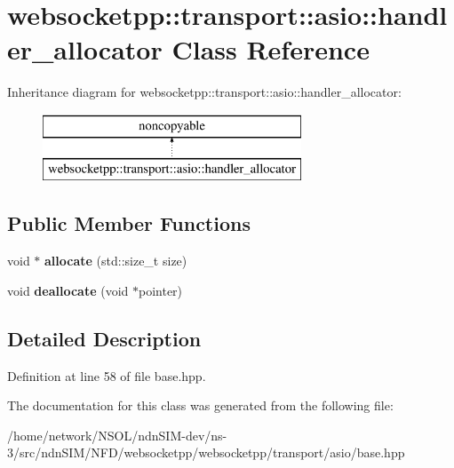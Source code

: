 \hypertarget{classwebsocketpp_1_1transport_1_1asio_1_1handler__allocator}{}\section{websocketpp\+:\+:transport\+:\+:asio\+:\+:handler\+\_\+allocator Class Reference}
\label{classwebsocketpp_1_1transport_1_1asio_1_1handler__allocator}
Inheritance diagram for websocketpp\+:\+:transport\+:\+:asio\+:\+:handler\+\_\+allocator\+:\begin{figure}[H]
\begin{center}
\leavevmode
\includegraphics[height=2.000000cm]{classwebsocketpp_1_1transport_1_1asio_1_1handler__allocator}
\end{center}
\end{figure}
\subsection*{Public Member Functions}
\begin{DoxyCompactItemize}
\item 
void $\ast$ {\bfseries allocate} (std\+::size\+\_\+t size)\hypertarget{classwebsocketpp_1_1transport_1_1asio_1_1handler__allocator_a8c004c7c383e8de53d02652cac71f5bb}{}\label{classwebsocketpp_1_1transport_1_1asio_1_1handler__allocator_a8c004c7c383e8de53d02652cac71f5bb}

\item 
void {\bfseries deallocate} (void $\ast$pointer)\hypertarget{classwebsocketpp_1_1transport_1_1asio_1_1handler__allocator_a8ba1b99267d13036f866f1e10d925efc}{}\label{classwebsocketpp_1_1transport_1_1asio_1_1handler__allocator_a8ba1b99267d13036f866f1e10d925efc}

\end{DoxyCompactItemize}


\subsection{Detailed Description}


Definition at line 58 of file base.\+hpp.



The documentation for this class was generated from the following file\+:\begin{DoxyCompactItemize}
\item 
/home/network/\+N\+S\+O\+L/ndn\+S\+I\+M-\/dev/ns-\/3/src/ndn\+S\+I\+M/\+N\+F\+D/websocketpp/websocketpp/transport/asio/base.\+hpp\end{DoxyCompactItemize}
